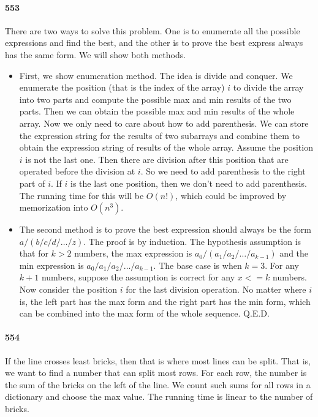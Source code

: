 \documentclass[11pt]{article}
\begin{document}
\begin{itemize}
\paragraph{553}
There are two ways to solve this problem. One is to enumerate all the possible expressions and find the best, and the other
is to prove the best express always has the same form. We will show both methods.
\begin{itemize}
\item First, we show enumeration method. The idea is divide and conquer. We enumerate the position (that is the index of the array) 
$i$ to divide the array into two parts and compute the possible
max and min results of the two parts. Then we can obtain the possible max and min results of the whole array. Now we only need
to care about how to add parenthesis. We can store the expression string for the results of two subarrays and combine them 
to obtain the expression string of results of the whole array. Assume the position $i$ is not the last one. Then there are
division after this position that are operated before the division at $i$. So we need to add parenthesis to the right part of
$i$. If $i$ is the last one position, then we don't need to add parenthesis. The running time for this will be $O(n!)$, which
could be improved by memorization into $O(n^3)$.

\item The second method is to prove the best expression should always be the form $a / (b / c / d / \dots / z)$.
The proof is by induction. The hypothesis assumption is that for $k>2$ numbers, the max expression is $a_0 / (a_1 / a_2 / \dots
/ a_{k-1})$ and the min expression is $a_0 / a_1 / a_2 / \dots / a_{k-1}$.
The base case is when $k = 3$. For any $k+1$ numbers, suppose the assumption is correct for any $x <= k$ numbers. Now consider the
position $i$ for the last division operation. No matter where $i$ is, the left part has the max form and the right part has the 
min form, which can be combined into the max form of the whole sequence. Q.E.D.
\end{itemize}


\paragraph{554}
If the line crosses least bricks, then that is where most lines can be split. That is, we want to find a number that can split
most rows. For each row, the number is the sum of the bricks on the left of the line. We count such sums for all rows in 
a dictionary and choose the max value. The running time is linear to the number of bricks.


\end{itemize}
\end{document}
